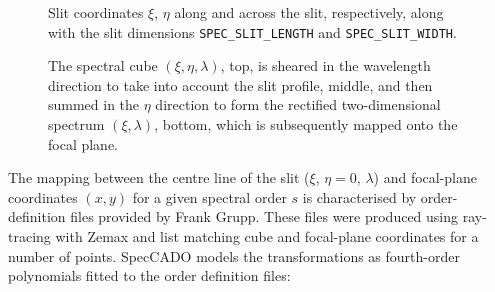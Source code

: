 \documentclass[a4paper,twoside,11pt]{article}
\begin{document}
\begin{figure}[b]
  \centering
  \caption{Slit coordinates $\xi$, $\eta$ along and across the slit,
    respectively, along with the slit dimensions
    \lstinline{SPEC_SLIT_LENGTH} and \lstinline{SPEC_SLIT_WIDTH}.}
  \label{fig:slit_coords}
\end{figure}

\begin{figure}[b]
  \centering
  \caption{The spectral cube $(\xi, \eta, \lambda)$, top, is sheared
    in the wavelength direction to take into account the slit profile,
    middle, and then summed in the $\eta$ direction to form the
    rectified two-dimensional spectrum $(\xi, \lambda)$, bottom, which
    is subsequently mapped onto the focal plane.}
  \label{fig:cube_collapse}
\end{figure}

The mapping between the centre line of the slit ($\xi$, $\eta=0$,
$\lambda$) and focal-plane coordinates $(x, y)$ for a given spectral
order $s$ is characterised by order-definition files provided by Frank
Grupp. These files were produced using ray-tracing with Zemax and list
matching cube and focal-plane coordinates for a number of
points. SpecCADO models the transformations as fourth-order
polynomials fitted to the order definition files:
\end{document}
